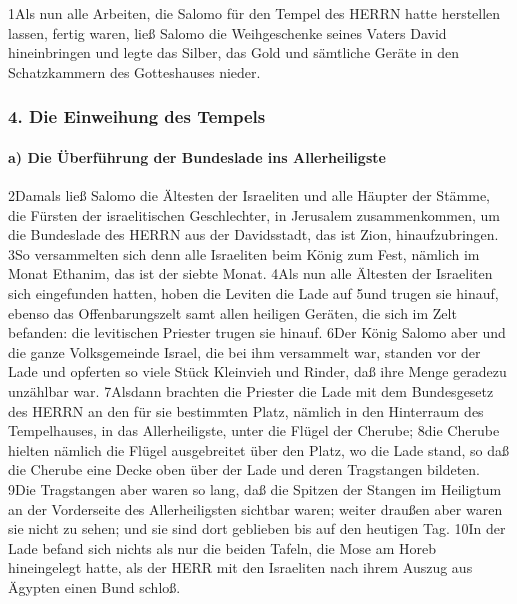 1Als nun alle Arbeiten, die Salomo für den Tempel des HERRN hatte
herstellen lassen, fertig waren, ließ Salomo die Weihgeschenke seines
Vaters David hineinbringen und legte das Silber, das Gold und sämtliche
Geräte in den Schatzkammern des Gotteshauses nieder.

\hypertarget{die-einweihung-des-tempels}{%
\subsubsection{4. Die Einweihung des
Tempels}\label{die-einweihung-des-tempels}}

\hypertarget{a-die-uxfcberfuxfchrung-der-bundeslade-ins-allerheiligste}{%
\paragraph{a) Die Überführung der Bundeslade ins
Allerheiligste}\label{a-die-uxfcberfuxfchrung-der-bundeslade-ins-allerheiligste}}

2Damals ließ Salomo die Ältesten der Israeliten und alle Häupter der
Stämme, die Fürsten der israelitischen Geschlechter, in Jerusalem
zusammenkommen, um die Bundeslade des HERRN aus der Davidsstadt, das ist
Zion, hinaufzubringen. 3So versammelten sich denn alle Israeliten beim
König zum Fest, nämlich im Monat Ethanim, das ist der siebte Monat. 4Als
nun alle Ältesten der Israeliten sich eingefunden hatten, hoben die
Leviten die Lade auf 5und trugen sie hinauf, ebenso das Offenbarungszelt
samt allen heiligen Geräten, die sich im Zelt befanden: die levitischen
Priester trugen sie hinauf. 6Der König Salomo aber und die ganze
Volksgemeinde Israel, die bei ihm versammelt war, standen vor der Lade
und opferten so viele Stück Kleinvieh und Rinder, daß ihre Menge
geradezu unzählbar war. 7Alsdann brachten die Priester die Lade mit dem
Bundesgesetz des HERRN an den für sie bestimmten Platz, nämlich in den
Hinterraum des Tempelhauses, in das Allerheiligste, unter die Flügel der
Cherube; 8die Cherube hielten nämlich die Flügel ausgebreitet über den
Platz, wo die Lade stand, so daß die Cherube eine Decke oben über der
Lade und deren Tragstangen bildeten. 9Die Tragstangen aber waren so
lang, daß die Spitzen der Stangen im Heiligtum an der Vorderseite des
Allerheiligsten sichtbar waren; weiter draußen aber waren sie nicht zu
sehen; und sie sind dort geblieben bis auf den heutigen Tag. 10In der
Lade befand sich nichts als nur die beiden Tafeln, die Mose am Horeb
hineingelegt hatte, als der HERR mit den Israeliten nach ihrem Auszug
aus Ägypten einen Bund schloß.

